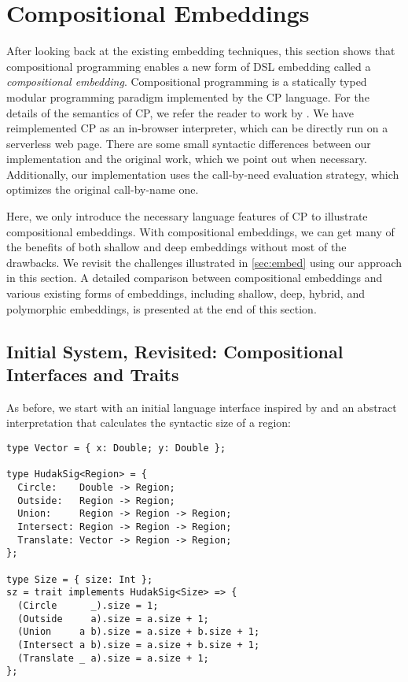 \section{Compositional Embeddings} \label{sec:lang}

After looking back at the existing embedding techniques, this section shows that
compositional programming enables a new form of DSL embedding called a
\emph{compositional embedding}. Compositional programming is a statically typed
modular programming paradigm implemented by the CP language. For the details of
the semantics of CP, we refer the reader to work by
\citet{zhang2021compositional}. We have reimplemented CP as an in-browser
interpreter, which can be directly run on a serverless web page. There are some
small syntactic differences between our implementation and the original work,
which we point out when necessary. Additionally, our implementation uses the
call-by-need evaluation strategy, which optimizes the original call-by-name one.

Here, we only introduce the necessary language features of CP to illustrate
compositional embeddings. With compositional embeddings, we can get many of the
benefits of both shallow and deep embeddings without most of the drawbacks. We
revisit the challenges illustrated in \autoref{sec:embed} using our approach in
this section. A detailed comparison between compositional embeddings and various
existing forms of embeddings, including shallow, deep, hybrid, and polymorphic
embeddings, is presented at the end of this section.

\subsection{Initial System, Revisited: Compositional Interfaces and Traits}

As before, we start with an initial language interface inspired by
\citet{hudak1998modular} and an abstract interpretation that calculates the
syntactic size of a region:

\begin{lstlisting}
type Vector = { x: Double; y: Double };

type HudakSig<Region> = {
  Circle:    Double -> Region;
  Outside:   Region -> Region;
  Union:     Region -> Region -> Region;
  Intersect: Region -> Region -> Region;
  Translate: Vector -> Region -> Region;
};

type Size = { size: Int };
sz = trait implements HudakSig<Size> => {
  (Circle      _).size = 1;
  (Outside     a).size = a.size + 1;
  (Union     a b).size = a.size + b.size + 1;
  (Intersect a b).size = a.size + b.size + 1;
  (Translate _ a).size = a.size + 1;
};
\end{lstlisting}


